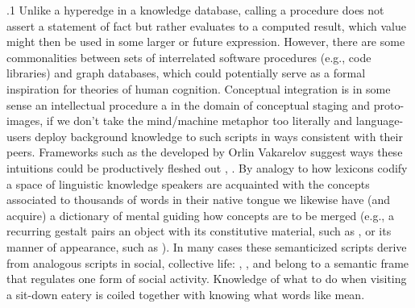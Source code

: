 \documentclass[11pt, twocolumn]{article}
\begin{document}
\p.1{%
Unlike a hyperedge in a knowledge database, calling a procedure
does not assert a statement of fact but rather evaluates to a computed
result, which value might then be used in some larger or future expression.
However, there are some commonalities between sets of interrelated
software procedures (e.g., code libraries) and graph databases,
which could potentially serve as a formal inspiration for theories
of human cognition.  Conceptual integration is in some sense an
intellectual procedure \mdash{} a  in the domain
of conceptual staging and proto-images, if we don't take the mind/machine
metaphor too literally \mdash{} and language-users deploy background knowledge
to  such scripts in ways consistent with their peers.
Frameworks such as the  developed
by Orlin Vakarelov suggest ways these intuitions could be productively
fleshed out , .  By analogy to how lexicons codify a space of linguistic
knowledge \mdash{} speakers are acquainted with the concepts associated to thousands of
words in their native tongue \mdash{} we likewise have (and acquire) a
dictionary of mental  guiding how concepts are to be
merged (e.g., a recurring gestalt pairs an object with its
constitutive material, such as , or its manner of appearance,
such as ).  In many cases these semanticized scripts derive
from analogous scripts in social, collective life: , , and
 belong to a semantic frame that regulates one form
of social activity.  Knowledge of what to do when visiting a
sit-down eatery is coiled together with knowing what words like 
mean.
} %
\end{document}
